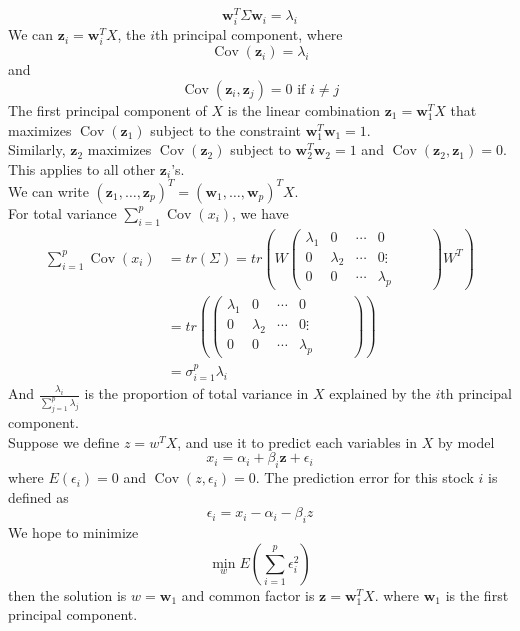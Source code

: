 \documentclass[11pt]{article}
\theoremstyle{definition}
\DeclareMathOperator{\cov}{Cov}
\begin{document}
\[
\mathbf{w}_i^T\Sigma\mathbf{w}_i = \lambda_i
\]
We can $\mathbf{z}_i = \mathbf{w}_i^TX$, the $i$th principal component, where
\[
\cov(\mathbf{z}_i) = \lambda_i
\]
and
\[
\cov(\mathbf{z}_i, \mathbf{z}_j) = 0 \text{ if }i\neq j
\]
The first principal component of $X$ is the linear combination $\mathbf{z}_1 = \mathbf{w}_1^T X$ that maximizes $\cov(\mathbf{z}_1)$ subject to the constraint $\mathbf{w}_1^T\mathbf{w}_1 = 1$.\\
Similarly, $\mathbf{z}_2$ maximizes $\cov(\mathbf{z}_2)$ subject to $\mathbf{w}_2^T\mathbf{w}_2=1$ and $\cov(\mathbf{z}_2, \mathbf{z}_1) = 0$.\\
This applies to all other $\mathbf{z}_i$'s.\\
We can write $(\mathbf{z}_1,\ldots, \mathbf{z}_p)^T = (\mathbf{w}_1,\ldots, \mathbf{w}_p)^TX$.\\
For total variance $\sum_{i=1}^p \cov(x_i)$, we have
\begin{align*}
\sum_{i=1}^p \cov(x_i) &= tr(\Sigma) = tr(W\begin{pmatrix}\lambda_1 & 0 & \cdots & 0 \\ 0 & \lambda_2 & \cdots & 0 \vdots &&& \\ 0 & 0 & \cdots &\lambda_p\end{pmatrix} W^T)\\
&=tr(\begin{pmatrix}\lambda_1 & 0 & \cdots & 0 \\ 0 & \lambda_2 & \cdots & 0 \vdots &&& \\ 0 & 0 & \cdots &\lambda_p\end{pmatrix})\\
&=\sigma_{i=1}^p \lambda_i
\end{align*}
And $\frac{\lambda_i}{\sum_{j=1}^p \lambda_j}$ is the proportion of total variance in $X$ explained by the $i$th principal component.\\
Suppose we define $z=w^TX$, and use it to predict each variables in $X$ by model
\[
x_i = \alpha_i + \beta_i\mathbf{z} + \epsilon_i
\]
where $E(\epsilon_i) = 0$ and $\cov(z, \epsilon_i) = 0$. The prediction error for this stock $i$ is defined as
\[
\epsilon_i = x_i - \alpha_i -\beta_iz
\]
We hope to minimize
\[
\min_w E(\sum_{i=1}^p\epsilon_i^2)
\]
then the solution is $w=\mathbf{w}_1$ and common factor is $\mathbf{z}=\mathbf{w}_1^TX$. where $\mathbf{w}_1$ is the first principal component.
\end{document}
